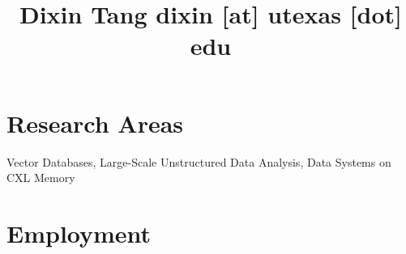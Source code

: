 \documentclass[10pt]{article} %
\begin{document}

\title{Dixin Tang {\small dixin [at] utexas [dot] edu}} %
\vspace{-5mm}

\begin{comment}
\parbox{0.5\textwidth}{ %
\begin{tabbing} %
\hspace{2.5cm} \= \hspace{4cm} \= \kill %
Postdoctoral Scholar \\
University of California, Berkeley \\
387 Soda Hall, Berkeley, CA 94720
\end{tabbing}}
\hfill %
\parbox{0.5\textwidth}{ %
\begin{tabbing} %
\hspace{2.5cm} \= \hspace{4cm} \= \kill %
(+1) 510-365-9300 \\
totemtang@berkeley.edu \\
\url{https://people.eecs.berkeley.edu/~totemtang/}
\end{tabbing}}
\vspace{-5mm}
\end{comment}


\section{Research Areas}

Vector Databases, Large-Scale Unstructured Data Analysis, Data Systems on CXL Memory 

\vspace{-5mm}

\section{Employment}
\end{document}
